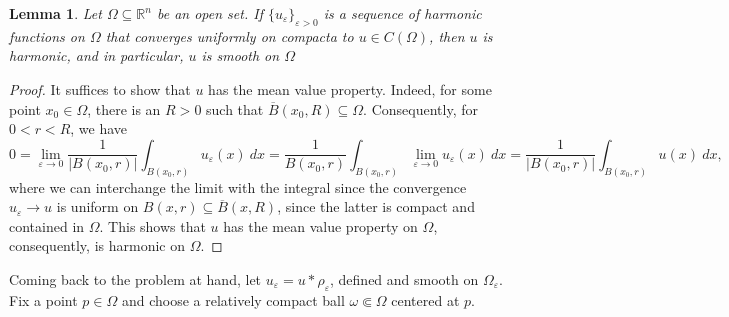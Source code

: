 \documentclass[10pt]{amsart}
\theoremstyle{thmstyle}
\newtheorem{lemma}[theorem]{Lemma}
\theoremstyle{defstyle}
\newcommand{\R}{\mathbb{R}}
\begin{document}
\begin{lemma}
	Let $\Omega\subseteq\R^n$ be an open set. If $\{u_\varepsilon\}_{\varepsilon > 0}$ is a sequence of harmonic functions on $\Omega$ that converges uniformly on compacta to $u\in C(\Omega)$, then $u$ is harmonic, and in particular, $u$ is smooth on $\Omega$
\end{lemma}
\begin{proof}
	It suffices to show that $u$ has the mean value property. Indeed, for some point $x_0\in\Omega$, there is an $R > 0$ such that $\overline B(x_0, R)\subseteq\Omega$. Consequently, for $0 < r < R$, we have 
	\begin{equation*}
		0 = \lim_{\varepsilon\to 0}\frac{1}{|B(x_0, r)|}\int_{B(x_0, r)} u_\varepsilon(x)~dx = \frac{1}{B(x_0, r)}\int_{B(x_0, r)}\lim_{\varepsilon\to 0}u_\varepsilon(x)~dx = \frac{1}{|B(x_0, r)|}\int_{B(x_0, r)} u(x)~dx,
	\end{equation*}
	where we can interchange the limit with the integral since the convergence $u_\varepsilon\to u$ is uniform on $B(x, r)\subseteq\overline B(x, R)$, since the latter is compact and contained in $\Omega$. This shows that $u$ has the mean value property on $\Omega$, consequently, is harmonic on $\Omega$.
\end{proof}

Coming back to the problem at hand, let $u_\varepsilon = u\ast\rho_\varepsilon$, defined and smooth on $\Omega_\varepsilon$. Fix a point $p\in\Omega$ and choose a relatively compact ball $\omega\Subset\Omega$ centered at $p$.
\end{document}
